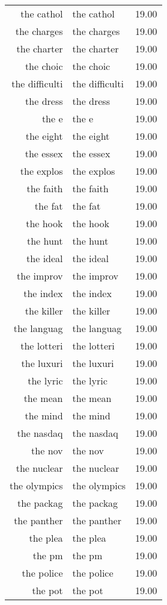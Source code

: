 \begin{table}[ht]
\begin{tabular}{rlr}
  the cathol & the cathol & 19.00 \\ 
  the charges & the charges & 19.00 \\ 
  the charter & the charter & 19.00 \\ 
  the choic & the choic & 19.00 \\ 
  the difficulti & the difficulti & 19.00 \\ 
  the dress & the dress & 19.00 \\ 
  the e & the e & 19.00 \\ 
  the eight & the eight & 19.00 \\ 
  the essex & the essex & 19.00 \\ 
  the explos & the explos & 19.00 \\ 
  the faith & the faith & 19.00 \\ 
  the fat & the fat & 19.00 \\ 
  the hook & the hook & 19.00 \\ 
  the hunt & the hunt & 19.00 \\ 
  the ideal & the ideal & 19.00 \\ 
  the improv & the improv & 19.00 \\ 
  the index & the index & 19.00 \\ 
  the killer & the killer & 19.00 \\ 
  the languag & the languag & 19.00 \\ 
  the lotteri & the lotteri & 19.00 \\ 
  the luxuri & the luxuri & 19.00 \\ 
  the lyric & the lyric & 19.00 \\ 
  the mean & the mean & 19.00 \\ 
  the mind & the mind & 19.00 \\ 
  the nasdaq & the nasdaq & 19.00 \\ 
  the nov & the nov & 19.00 \\ 
  the nuclear & the nuclear & 19.00 \\ 
  the olympics & the olympics & 19.00 \\ 
  the packag & the packag & 19.00 \\ 
  the panther & the panther & 19.00 \\ 
  the plea & the plea & 19.00 \\ 
  the pm & the pm & 19.00 \\ 
  the police & the police & 19.00 \\ 
  the pot & the pot & 19.00 \\ 

\end{tabular}
\end{table}
